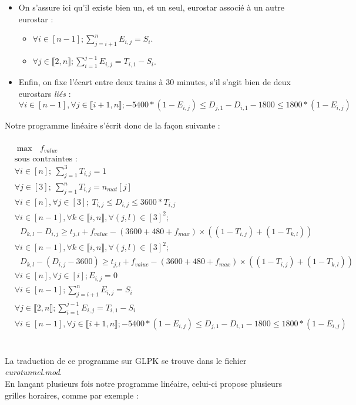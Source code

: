 \documentclass{rapport}
\begin{document}
\begin{itemize}
	\item On s'assure ici qu'il existe bien un, et un seul, eurostar associé à un autre eurostar :
	\begin{itemize}
		\item $\forall i \in [n-1]; \sum_{j = i+1}^n E_{i, j} = S_i$.
		\item $\forall j \in \llbracket 2, n \rrbracket; \sum_{i = 1}^{j-1} E_{i, j} = T_{i, 1} - S_i$.
	\end{itemize}
	\item Enfin, on fixe l'écart entre deux trains à 30 minutes, s'il s'agit bien de deux eurostars \emph{liés} : \\ $\forall i \in [n-1], \forall j \in \llbracket i+1, n \rrbracket; - 5400 * (1 - E_{i, j})  \le D_{j, 1} - D_{i, 1} - 1800 \le 1800 * (1 - E_{i, j})$

\end{itemize}
\clearpage

Notre programme linéaire s'écrit donc de la façon suivante : \\
\ \\
\begin{equation*}
\begin{aligned}
& \max \ \ \  f_{value} \\
& \text{sous contraintes : } \\
& \forall i \in [n]; \ \sum_{j = 1}^3 T_{i, j} = 1 \\
& \forall j \in [3]; \ \sum_{j = 1}^n T_{i, j} = n_{mat}[j] \\
& \forall i \in [n], \forall j \in [3]; \ T_{i, j} \le D_{i, j} \le 3600 * T_{i, j} \\
& \forall i \in [n-1], \forall k \in \llbracket i, n \rrbracket, \forall (j, l) \in [3]^2; \\
& \ \ \ D_{k, l} - D_{i, j} \ge t_{j, l} + f_{value} - (3600 + 480 + f_{max}) \times ((1 - T_{i, j}) + (1 - T_{k, l})) \\
& \forall i \in [n-1], \forall k \in \llbracket i, n \rrbracket, \forall (j, l) \in [3]^2; \\
& \ \ \ D_{k, l} - (D_{i, j} - 3600) \ge t_{j, l} + f_{value} - (3600 + 480 + f_{max}) \times ((1 - T_{i, j}) + (1 - T_{k, l})) \\
& \forall i \in [n], \forall j \in [i]; E_{i, j} = 0 \\
& \forall i \in [n-1]; \sum_{j = i+1}^n E_{i, j} = S_i \\
& \forall j \in \llbracket 2, n \rrbracket; \sum_{i = 1}^{j-1} E_{i, j} = T_{i, 1} - S_i \\
& \forall i \in [n-1], \forall j \in \llbracket i+1, n \rrbracket; - 5400 * (1 - E_{i, j})  \le D_{j, 1} - D_{i, 1} - 1800 \le 1800 * (1 - E_{i, j})
\end{aligned}
\end{equation*}
\ \\
\ \\
La traduction de ce programme sur GLPK se trouve dans le fichier \emph{eurotunnel.mod}. \\
En lançant plusieurs fois notre programme linéaire, celui-ci propose plusieurs grilles horaires, comme par exemple :
\end{document}
